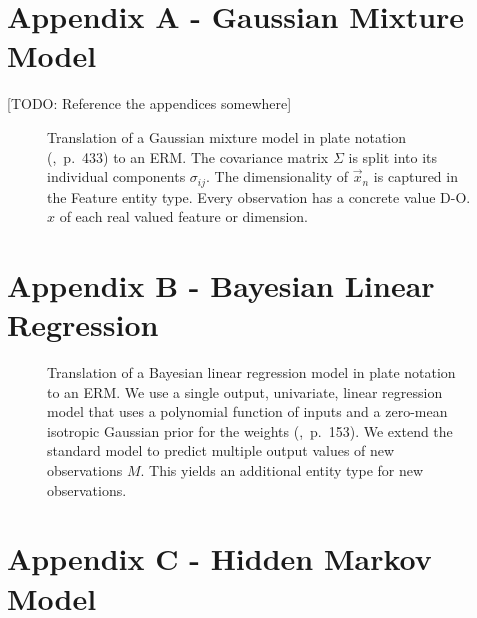 \section*{Appendix A - Gaussian Mixture Model}

[TODO: Reference the appendices somewhere]

\vspace*{1em}
\begin{figure}[h!]
\centering
\scalebox{\tikzScale}{\adjustTikzSize }
\caption[Gaussian mixture model plate model to ERM translation]{Translation of a Gaussian mixture model in plate notation (\cite{bishop2006pattern},~p.~433) to an ERM. The covariance matrix $\Sigma$ is split into its individual components $\sigma_{ij}$. The dimensionality of $\vec x_n$ is captured in the Feature entity type. Every observation has a concrete value D-O.$x$ of each real valued feature or dimension.}\label{fig:gaussian_mixture}
\end{figure}

\newpage

\section*{Appendix B - Bayesian Linear Regression}

\vspace*{1em}
\begin{figure}[h!]
\centering
\scalebox{\tikzScale}{\adjustTikzSize }
\caption[Linear regression plate model to ERM translation]{Translation of a Bayesian linear regression model in plate notation to an ERM. We use a single output, univariate, linear regression model that uses a polynomial function of inputs and a zero-mean isotropic Gaussian prior for the weights (\cite{bishop2006pattern},~p.~153). We extend the standard model to predict multiple output values of new observations $M$. This yields an additional entity type for new observations.}\label{fig:bayesian_regression}
\end{figure}

\newpage

\section*{Appendix C - Hidden Markov Model}

